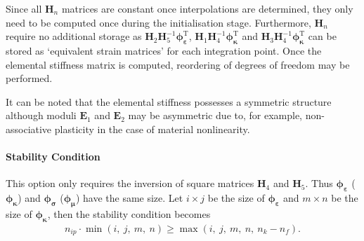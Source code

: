 \documentclass[3p,sort&compress,11pt,fleqn,review]{elsarticle}
\newcommand*{\mb}[1]{\boldsymbol{#1}}
\newcommand*{\mT}{\mathrm{T}}
\begin{document}
Since all $\mb{H}_n$ matrices are constant once interpolations are determined, they only need to be computed once during the initialisation stage. Furthermore, $\mb{H}_n$ require no additional storage as $\mb{H}_2\mb{H}_5^{-1}\mb{\phi}_{\mb{\varepsilon}}^\mT$, $\mb{H}_1\mb{H}_4^{-1}\mb{\phi}_{\mb{\kappa}}^\mT$ and $\mb{H}_3\mb{H}_4^{-1}\mb{\phi}_{\mb{\kappa}}^\mT$ can be stored as `equivalent strain matrices' for each integration point. Once the elemental stiffness matrix is computed, reordering of degrees of freedom may be performed.

It can be noted that the elemental stiffness possesses a symmetric structure although moduli $\mb{E}_1$ and $\mb{E}_2$ may be asymmetric due to, for example, non-associative plasticity in the case of material nonlinearity.
\paragraph{Stability Condition}
This option only requires the inversion of square matrices $\mb{H}_4$ and $\mb{H}_5$. Thus $\mb{\phi}_{\mb{\varepsilon}}$ ($\mb{\phi}_{\mb{\kappa}}$) and $\mb{\phi}_{\mb{\sigma}}$ ($\mb{\phi}_{\mb{\mu}}$) have the same size. Let $i\times{}j$ be the size of $\mb{\phi}_{\mb{\varepsilon}}$ and $m\times{}n$ be the size of $\mb{\phi}_{\mb{\kappa}}$, then the stability condition becomes
\begin{gather}\label{eq:stability2}
n_{ip}\cdot{}\min\left(i,~j,~m,~n\right)\geqslant{}\max\left(i,~j,~m,~n,~n_k-n_f\right).
\end{gather}
\end{document}
